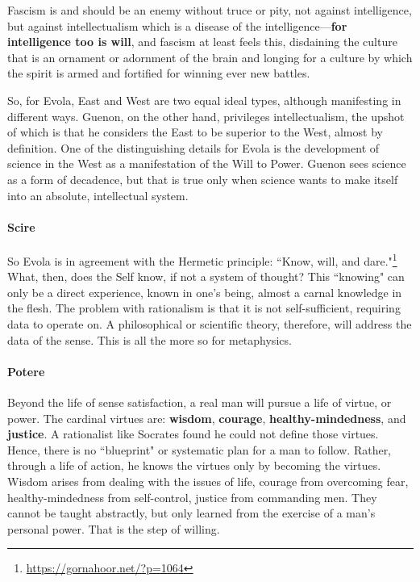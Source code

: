 \begin{quotex}
Fascism is and should be an enemy without truce or pity, not against intelligence, but against intellectualism which is a disease of the intelligence—\textbf{for intelligence too is will}, and fascism at least feels this, disdaining the culture that is an ornament or adornment of the brain and longing for a culture by which the spirit is armed and fortified for winning ever new battles. 

\end{quotex}
So, for Evola, East and West are two equal ideal types, although manifesting in different ways. Guenon, on the other hand, privileges intellectualism, the upshot of which is that he considers the East to be superior to the West, almost by definition. One of the distinguishing details for Evola is the development of science in the West as a manifestation of the Will to Power. Guenon sees science as a form of decadence, but that is true only when science wants to make itself into an absolute, intellectual system.

\paragraph{Scire}
So Evola is in agreement with the Hermetic principle: ``Know, will, and dare."\footnote{\url{https://gornahoor.net/?p=1064}} What, then, does the Self know, if not a system of thought? This ``knowing" can only be a direct experience, known in one's being, almost a carnal knowledge in the flesh. The problem with rationalism is that it is not self-sufficient, requiring data to operate on. A philosophical or scientific theory, therefore, will address the data of the sense. This is all the more so for metaphysics.

\paragraph{Potere}
Beyond the life of sense satisfaction, a real man will pursue a life of virtue, or power. The cardinal virtues are: \textbf{wisdom}, \textbf{courage}, \textbf{healthy-mindedness}, and \textbf{justice}. A rationalist like Socrates found he could not define those virtues. Hence, there is no ``blueprint" or systematic plan for a man to follow. Rather, through a life of action, he knows the virtues only by becoming the virtues. Wisdom arises from dealing with the issues of life, courage from overcoming fear, healthy-mindedness from self-control, justice from commanding men. They cannot be taught abstractly, but only learned from the exercise of a man's personal power. That is the step of willing.

